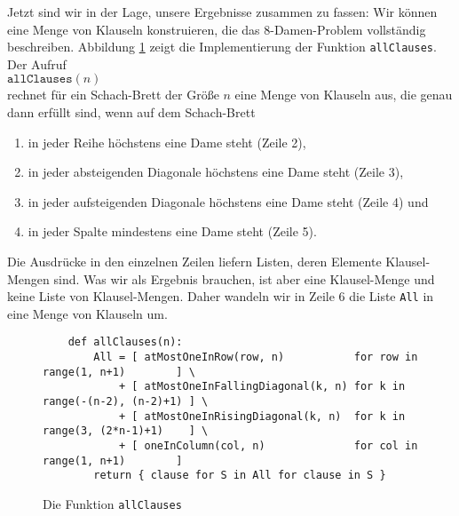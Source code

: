 Jetzt sind wir in der Lage, unsere Ergebnisse zusammen zu fassen:  Wir können eine
Menge von Klauseln konstruieren, die das 8-Damen-Problem vollständig beschreiben.
Abbildung \ref{fig:allClauses} zeigt die Implementierung der Funktion \texttt{allClauses}.
Der Aufruf \\[0.2cm]
\hspace*{1.3cm} $\texttt{allClauses}(n)$ \\[0.2cm]
rechnet für ein Schach-Brett der Größe $n$ eine Menge von Klauseln aus, die
genau dann erfüllt sind, wenn auf dem Schach-Brett
\begin{enumerate}
\item in jeder Reihe höchstens eine Dame steht (Zeile 2),
\item in jeder absteigenden Diagonale höchstens eine Dame steht (Zeile 3),
\item in jeder aufsteigenden Diagonale höchstens eine Dame steht (Zeile 4) und
\item in jeder Spalte mindestens eine Dame steht (Zeile 5).
\end{enumerate}
Die Ausdrücke in den einzelnen Zeilen liefern Listen, deren Elemente
Klausel-Mengen sind.  Was wir als Ergebnis brauchen, ist aber eine Klausel-Menge
und keine Liste von Klausel-Mengen.  Daher wandeln wir in Zeile 6 die Liste \texttt{All} in eine Menge von
Klauseln um.


\begin{figure}[!ht]
  \centering
\begin{verbatim}
    def allClauses(n):
        All = [ atMostOneInRow(row, n)           for row in range(1, n+1)        ] \
            + [ atMostOneInFallingDiagonal(k, n) for k in range(-(n-2), (n-2)+1) ] \
            + [ atMostOneInRisingDiagonal(k, n)  for k in range(3, (2*n-1)+1)    ] \
            + [ oneInColumn(col, n)              for col in range(1, n+1)        ]
        return { clause for S in All for clause in S }
\end{verbatim}
\vspace*{-0.3cm}
  \caption{Die Funktion \texttt{allClauses}}
  \label{fig:allClauses}
\end{figure}

